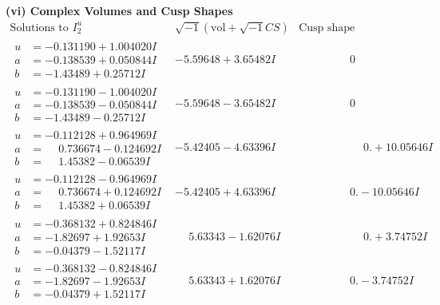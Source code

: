 \documentclass[1p]{elsarticle_modified}
\theoremstyle{definition}
\newcommand{\I}{\sqrt{-1}}
\begin{document}
\newpage\flushleft \textbf{(vi) Complex Volumes and Cusp Shapes}
$$\begin{array}{c|c|c}  
\text{Solutions to }I^u_{2}& \I (\text{vol} + \sqrt{-1}CS) & \text{Cusp shape}\\
 \hline 
\begin{aligned}
u &= -0.131190 + 1.004020 I \\
a &= -0.138539 + 0.050844 I \\
b &= -1.43489 + 0.25712 I\end{aligned}
 & -5.59648 + 3.65482 I & \phantom{-0.000000 } 0 \\ \hline\begin{aligned}
u &= -0.131190 - 1.004020 I \\
a &= -0.138539 - 0.050844 I \\
b &= -1.43489 - 0.25712 I\end{aligned}
 & -5.59648 - 3.65482 I & \phantom{-0.000000 } 0 \\ \hline\begin{aligned}
u &= -0.112128 + 0.964969 I \\
a &= \phantom{-}0.736674 - 0.124692 I \\
b &= \phantom{-}1.45382 - 0.06539 I\end{aligned}
 & -5.42405 - 4.63396 I & \phantom{-0.000000 -}0. + 10.05646 I \\ \hline\begin{aligned}
u &= -0.112128 - 0.964969 I \\
a &= \phantom{-}0.736674 + 0.124692 I \\
b &= \phantom{-}1.45382 + 0.06539 I\end{aligned}
 & -5.42405 + 4.63396 I & \phantom{-0.000000 } 0. - 10.05646 I \\ \hline\begin{aligned}
u &= -0.368132 + 0.824846 I \\
a &= -1.82697 + 1.92653 I \\
b &= -0.04379 - 1.52117 I\end{aligned}
 & \phantom{-}5.63343 - 1.62076 I & \phantom{-0.000000 -}0. + 3.74752 I \\ \hline\begin{aligned}
u &= -0.368132 - 0.824846 I \\
a &= -1.82697 - 1.92653 I \\
b &= -0.04379 + 1.52117 I\end{aligned}
 & \phantom{-}5.63343 + 1.62076 I & \phantom{-0.000000 } 0. - 3.74752 I \\ \hline\begin{aligned}

\end{aligned}
\end{array}$$
\end{document}
